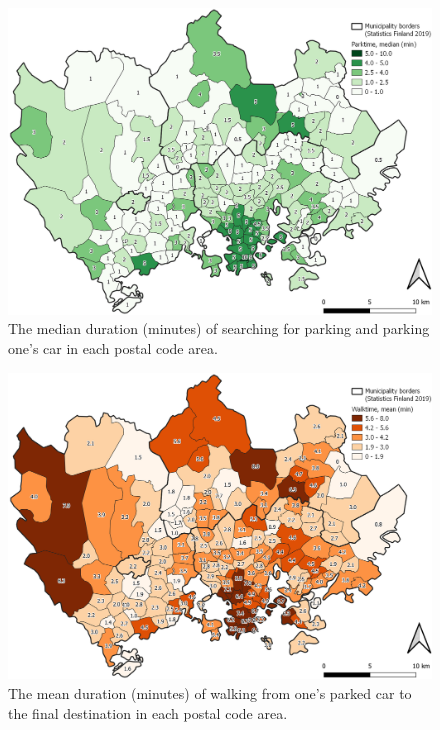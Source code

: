 \begin{figure}
    \centering
    \includegraphics[width=\textwidth]{images/thesis_postalvis_parkmedian.png}
    \caption[Parktime, median, in the study area]{The median duration (minutes) of searching for parking and parking one's car in each postal code area.}%
    \label{fig:postalvis_parkmedian}%
\end{figure}

\begin{figure}
    \centering
    \includegraphics[width=\textwidth]{images/thesis_postalvis_walkmean.png}
    \caption[Walktime, mean, in the study area]{The mean duration (minutes) of walking from one's parked car to the final destination in each postal code area.}%
    \label{fig:postalvis_walkmean}%
\end{figure}

